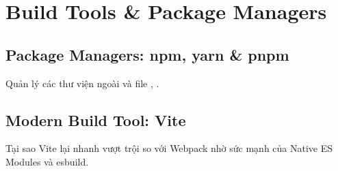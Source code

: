 \chapter{Build Tools \& Package Managers}
\label{chap:build_tools_vite}

\section{Package Managers: npm, yarn \& pnpm}
Quản lý các thư viện ngoài và file , .

\section{Modern Build Tool: Vite}
Tại sao Vite lại nhanh vượt trội so với Webpack nhờ sức mạnh của Native ES Modules và esbuild.
